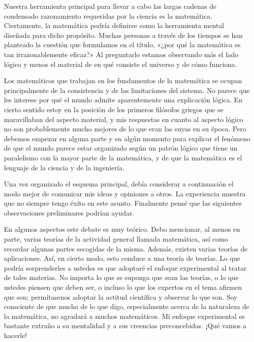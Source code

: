 \documentclass[a4paper, 12pt]{article}
\begin{document}
 

Nuestra herramienta principal para llevar a cabo las largas cadenas de condensado razonamiento requeridas por la ciencia es la matemática. Ciertamente, la matemática podría definirse como la herramienta mental diseñada para dicho propósito. Muchas personas a través de los tiempos se han planteado la cuestión que formulamos en el título, «¿por qué la matemática es tan irrazonablemente eficaz?» Al preguntarlo estamos observando más el lado lógico y menos el material de en qué consiste el universo y de cómo funciona.

 

Los matemáticos que trabajan en los fundamentos de la matemática se ocupan principalmente de la consistencia y de las limitaciones del sistema. No parece que les interese por qué el mundo admite aparentemente una explicación lógica. En cierto sentido estoy en la posición de los primeros filósofos griegos que se maravillaban del aspecto material, y mis respuestas en cuanto al aspecto lógico no son probablemente mucho mejores de lo que eran las suyas en su época. Pero debemos empezar en alguna parte y en algún momento para explicar el fenómeno de que el mundo parece estar organizado según un patrón lógico que tiene un paralelismo con la mayor parte de la matemática, y de que la matemática es el lenguaje de la ciencia y de la ingeniería.

 

Una vez organizado el esquema principal, debía considerar a continuación el modo mejor de comunicar mis ideas y opiniones a otros. La experiencia muestra que no siempre tengo éxito en este asunto. Finalmente pensé que las siguientes observaciones preliminares podrían ayudar.

 

En algunos aspectos este debate es muy teórico. Debo mencionar, al menos en parte, varias teorías de la actividad general llamada matemática, así como recordar algunas partes escogidas de la misma. Además, existen varias teorías de aplicaciones. Así, en cierto modo, esto conduce a una teoría de teorías. Lo que podría sorprenderles a ustedes es que adoptaré el enfoque experimental al tratar de tales materias. No importa lo que se suponga que sean las teorías, o lo que ustedes piensen que deben ser, o incluso lo que los expertos en el tema afirmen que son; permítasenos adoptar la actitud científica y observar lo que son. Soy consciente de que mucho de lo que digo, especialmente acerca de la naturaleza de la matemática, no agradará a muchos matemáticos. Mi enfoque experimental es bastante extraño a su mentalidad y a sus creencias preconcebidas. ¡Qué vamos a hacerle!
\end{document}
